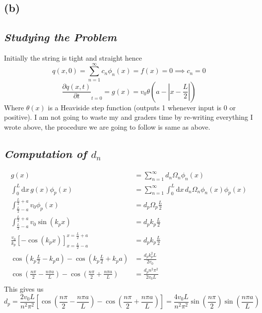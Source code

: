 \documentclass[letter, 10pts]{article}
\begin{document}
\subsection*{(b)}
\subsection*{\emph{Studying the Problem}}
Initially the string is tight and straight hence 
\[
q(x, 0) = \sum_{n=1}^{\infty} c_n \phi_n(x) = f(x) = 0 \implies \boxed{
c_n = 0
}
\] 
\[
	\frac{\partial q(x,t)}{\partial t} _{t = 0} = g(x) = v_0 \theta\left(a - \left|x - \frac{L}{2} \right|\right)
\]
Where $\theta(x)$ is a Heaviside step function (outputs 1 whenever input is 0 or positive).
I am not going to waste my and graders time by re-writing everything I wrote above, the procedure we are going to follow is same as above. 

\subsection*{\emph{Computation of $d_n$ }}
\begin{align*}
	g(x) &= \sum_{n=1}^{\infty} d_n \Omega_n \phi_n(x)   \\
\int_{0}^{L} \mathrm{d} x\, 	g(x) \phi_p (x) &= \sum_{n=1}^{\infty}  \int_{0}^{L} \mathrm{d} x \, d_n \Omega_n \phi_n (x) \phi_p (x)\\
\int_{\frac{L}{2} - a}^{\frac{L}{2} + a} v_0 \phi_p (x) &= d_p  \Omega_p \frac{L}{2} \\ 
\int_{\frac{L}{2}- a}^{\frac{L}{2} + a} v_0 \sin (k_p x) &= d_p  k_p \frac{L}{2}\\ 
\frac{v_0}{k_p} \left[ - \cos \left(k_p x\right)\right]_{x = \frac{L}{2} - a}^{x = \frac{L}{2}+a} &= d_p k_p \frac{L}{2} \\ 
\cos \left(k_p \frac{L}{2} - k_p a\right)- \cos \left( k_p \frac{L}{2} + k_p a\right)  &= \frac{d_p k_p^2 L}{2v_0} \\
\cos \left( \frac{n \pi }{2} - \frac{n \pi a}{L}\right) - 
\cos \left( \frac{n \pi }{2} + \frac{n \pi a}{L}\right) &= \frac{d_p n^2 \pi ^2 }{2 v_0 L} \\ 
\end{align*}
This gives us 
\[
d_p = \frac{2 v_0 L}{n^2 \pi ^2} 
\left[ 
\cos \left( \frac{n \pi }{2} - \frac{n \pi a}{L}\right) - 
\cos \left( \frac{n \pi }{2} + \frac{n \pi a}{L}\right) 
\right] 
= \frac{4 v_0 L}{n^2 \pi ^2} \sin \left(\frac{n \pi }{2}\right) \sin \left(\frac{n \pi a}{L}\right)
\]
\end{document}
